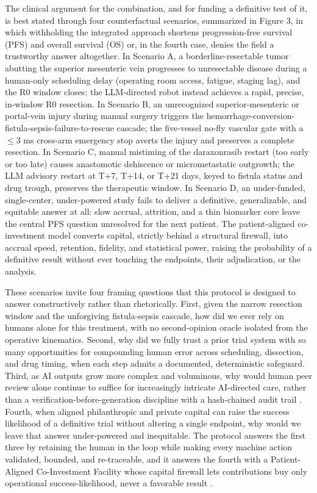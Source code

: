 The clinical argument for the combination, and for funding a definitive test of
it, is best stated through four counterfactual scenarios, summarized in Figure 3,
in which withholding the integrated approach shortens progression-free survival
(PFS) and overall survival (OS) or, in the fourth case, denies the field a
trustworthy answer altogether. In Scenario A, a borderline-resectable tumor
abutting the superior mesenteric vein progresses to unresectable disease during a
human-only scheduling delay (operating room access, fatigue, staging lag), and the
R0 window closes; the LLM-directed robot instead achieves a rapid, precise,
in-window R0 resection. In Scenario B, an unrecognized superior-mesenteric or
portal-vein injury during manual surgery triggers the
hemorrhage-conversion-fistula-sepsis-failure-to-rescue cascade; the five-vessel
no-fly vascular gate with a $\leq 3$ ms cross-arm emergency stop averts the injury
and preserves a complete resection. In Scenario C, manual mistiming of the
daraxonrasib restart (too early or too late) causes anastomotic dehiscence or
micrometastatic outgrowth; the LLM advisory restart at T+7, T+14, or T+21 days,
keyed to fistula status and drug trough, preserves the therapeutic window. In
Scenario D, an under-funded, single-center, under-powered study fails to deliver a
definitive, generalizable, and equitable answer at all: slow accrual, attrition,
and a thin biomarker core leave the central PFS question unresolved for the next
patient. The patient-aligned co-investment model converts capital, strictly behind
a structural firewall, into accrual speed, retention, fidelity, and statistical
power, raising the probability of a definitive result without ever touching the
endpoints, their adjudication, or the analysis.

These scenarios invite four framing questions that this protocol is designed to
answer constructively rather than rhetorically. First, given the narrow resection
window and the unforgiving fistula-sepsis cascade, how did we ever rely on humans
alone for this treatment, with no second-opinion oracle isolated from the
operative kinematics. Second, why did we fully trust a prior trial system with so
many opportunities for compounding human error across scheduling, dissection, and
drug timing, when each step admits a documented, deterministic safeguard. Third,
as AI outputs grow more complex and voluminous, why would human peer review alone
continue to suffice for increasingly intricate AI-directed care, rather than a
verification-before-generation discipline with a hash-chained audit trail
\cite{kawchak2026hr9510}. Fourth, when aligned philanthropic and private capital
can raise the success likelihood of a definitive trial without altering a single
endpoint, why would we leave that answer under-powered and inequitable. The
protocol answers the first three by retaining the human in the loop while making
every machine action validated, bounded, and re-traceable, and it answers the
fourth with a Patient-Aligned Co-Investment Facility whose capital firewall lets
contributions buy only operational success-likelihood, never a favorable result
\cite{kawchak2026hr9510}.

